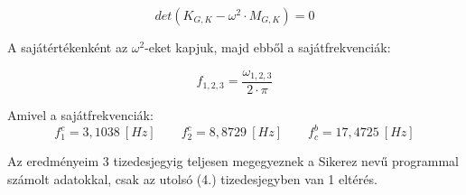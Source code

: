 \documentclass{article}
\newcommand{\rpm}{\raisebox{.2ex}{$\scriptstyle\pm$}}
\begin{document}
			\begin{equation}
				det(K_{G,K} - \omega^2 \cdot M_{G,K}) = 0
			\end{equation}
			
			A sajátértékenként az $\omega^2$-eket kapjuk, majd ebből a sajátfrekvenciák:
			
			\begin{equation}
				f_{1,2,3}=\frac{\omega_{1,2,3}}{2\cdot \pi}
			\end{equation}
			
			Amivel a sajátfrekvenciák:	
			\[f_1^c=3,1038~[Hz] \qquad f_2^c=8,8729~[Hz] \qquad f_c^b=17,4725~[Hz]  \]
			
			Az eredményeim 3 tizedesjegyig teljesen megegyeznek a Sikerez nevű programmal számolt adatokkal, csak az utolsó (4.) tizedesjegyben van \rpm1 eltérés.
\end{document}
